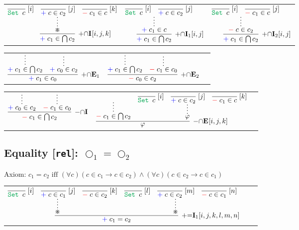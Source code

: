 \documentclass[11pt]{article}
\begin{document}
\noindent
\begin{tabular}{ccc}
$
\infer[\AssertRule{\cap}\Intro{}{[i,j,k]}]{\Assert{c_1\in \bigcap c_2}}{
    \infer*{\divideontimes}{
    	\infer[\Label{i}]{\Set{c}}{}
    	&
    	\infer[\Label{j}]{\Assert{c\in c_2}}{}
    	&
    	\infer[\Label{k}]{\Deny{c_1\in c}}{}
    }
}
$
\hspace{0.5cm}
&
$
\infer[\AssertRule{\cap}\Intro{1}{[i,j]}]{\Assert{c_1\in \bigcap c_2}}{
    \infer*{\Assert{c_1\in c}}{
    	\infer[\Label{i}]{\Set{c}}{}
    	&
    	\infer[\Label{j}]{\Assert{c\in c_2}}{}
    }
}
$
\hspace{0.5cm}
&
$
\infer[\AssertRule{\cap}\Intro{2}{[i,j]}]{\Assert{c_1\in \bigcap c_2}}{
    \infer*{\Deny{c\in c_2}}{
    	\infer[\Label{i}]{\Set{c}}{}
    	&
    	\infer[\Label{j}]{\Deny{c_1\in c}}{}
    }
}
$
\end{tabular}

\bigskip
\noindent

\begin{tabular}{ccc}
$
\infer[\AssertRule{\cap}\Elim{1}]{\Assert{c_1\in c_0}}{
	\infer*{\Assert{c_1\in \bigcap c_2}}{} 
	& 
	\infer*{\Assert{c_0\in c_2}}{}
}
$
\hspace{1cm}
&
$
\infer[\AssertRule{\cap}\Elim{2}]{\Deny{c_0\in c_2}}{
	\infer*{\Assert{c_1\in \bigcap c_2}}{} 
	& 
	\infer*{\Deny{c_1\in c_0}}{}
}
$
\end{tabular}

\bigskip
\noindent
\begin{tabular}{ccc}
$
\infer[\DenyRule{\cap}\Intro{}]{\Deny{c_1\in \bigcap c_2}}{
	\infer*{\Assert{c_0\in c_2}}{}
	& 
	\infer*{\Deny{c_1\in c_0}}{}
}
$
\hspace{1cm}
&
$
\infer[\DenyRule{\cap}\Elim{}{[i,j,k]}]{\varphi}{
	\infer*{\Deny{c_1\in \bigcap c_2}}{}
	&
	\infer*{\varphi}{
		\infer[\Label{i}]{\Set{c}}{}
		&
		\infer[\Label{j}]{\Assert{c\in c_2}}{}
		&
		\infer[\Label{k}]{\Deny{c_1\in c}}{}
	}
}
$
\end{tabular}
\bigskip

\newpage

\subsection*{Equality [\texttt{rel}]: $\bigcirc_1 = \bigcirc_2$}

\smallskip
\noindent
Axiom: $c_1 = c_2\text{ iff }
(\forall c) (c\in c_1 \to c\in c_2) \land (\forall c) (c\in c_2 \to c\in c_1)$
\smallskip
\smallskip

\noindent
\begin{tabular}{ccc}
$
\infer[\AssertRule{=}\Intro{1}{[i,j,k,l,m,n]}]{\Assert{c_1= c_2}}{
	\infer*{\divideontimes}{
		\infer[\Label{i}]{\Set{c}}{} 
		& 
		\infer[\Label{j}]{\Assert{c\in c_1}}{}
		& 
		\infer[\Label{k}]{\Deny{c\in c_2}}{}
	}
    &
	\infer*{\divideontimes}{
		\infer[\Label{l}]{\Set{c}}{} 
		& 
		\infer[\Label{m}]{\Assert{c\in c_2}}{}
		& 
		\infer[\Label{n}]{\Deny{c\in c_1}}{}
	}
}
$
\end{tabular}
\end{document}
